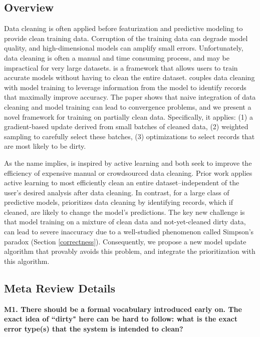 \subsection*{Overview} 
Data cleaning is often applied before featurization and predictive modeling to provide clean training data.
Corruption of the training data can degrade model quality, and high-dimensional models can amplify small errors.
Unfortunately, data cleaning is often a manual and time consuming process, and may be impractical for very large datasets.
\sys is a framework that allows users to train accurate models without having to clean the entire dataset. 
\sys couples data cleaning with model training to leverage information from the model to identify records that maximally improve accuracy.
The paper shows that naive integration of data cleaning and model training can lead to convergence problems, and we present a novel framework for training on partially clean data.
Specifically, it applies: (1) a gradient-based update derived from small batches of cleaned data, (2) weighted sampling to carefully select these batches, (3) optimizations to select records that are most likely to be dirty.

As the name implies, \sys is inspired by active learning and both seek to improve the efficiency of expensive manual or crowdsourced data cleaning.
Prior work applies active learning to most efficiently clean an entire dataset--independent of the user's desired analysis after data cleaning.
In contrast, for a large class of predictive models, \sys prioritizes data cleaning by identifying records, which if cleaned, are likely to change the model's predictions.
The key new challenge is that model training on a mixture of clean data and not-yet-cleaned dirty data, can lead to severe inaccuracy due to a well-studied phenomenon called Simpson's paradox (Section \ref{correctness}).
Consequently, we propose a new model update algorithm that provably avoids this problem, and integrate the prioritization with this algorithm.

\vspace{0.5em}

\subsection*{Meta Review Details} 

\noindent\noindent \textbf{M1. There should be a formal vocabulary introduced early on. The exact idea of ``dirty" here can be hard to follow: what is the exact error type(s) that the system is intended to clean?}


